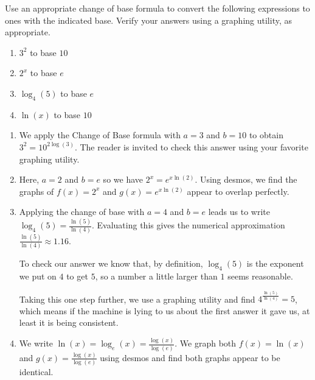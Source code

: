 \documentclass{ximera}
\begin{document}
\begin{example}  Use an appropriate change of base formula to convert the following expressions to ones with the indicated base.  Verify your answers using a graphing utility, as appropriate.


\begin{enumerate}

\item  $3^{2}$ to base $10$

\item  $2^{x}$ to base $e$

\item $\log_{4}(5)$ to base $e$

\item $\ln(x)$ to base $10$

\end{enumerate}

\begin{explanation}

\begin{enumerate}

\item  We apply the Change of Base formula with $a=3$ and $b=10$ to obtain $3^2 = 10^{2 \log(3)}$. The reader is invited to check this answer using your favorite graphing utility.

\item  Here, $a=2$ and $b = e$ so we have $2^{x} = e^{x \ln(2)}$.  Using desmos, we find the graphs of $f(x) = 2^x$ and $g(x) = e^{x \ln(2)}$ appear to overlap perfectly.

\begin{center}
\end{center}

\item  Applying the change of base with $a=4$ and $b=e$ leads us to write $\log_{4}(5) = \frac{\ln(5)}{\ln(4)}$.  Evaluating this gives the numerical approximation  $\frac{\ln(5)}{\ln(4)} \approx 1.16$. 

To check our answer we know that,  by definition, $\log_{4}(5)$ is the exponent we put on $4$ to get $5$, so a number a little larger than $1$ seems reasonable.

Taking this one step further, we use a graphing utility and find $4^{ \frac{\ln(5)}{\ln(4)}} = 5$, which means if  the machine  is lying to us about the first answer it gave us, at least it is being consistent.

\item  We write $\ln(x) = \log_{e}(x) = \frac{\log(x)}{\log(e)}$.  We graph both $f(x) = \ln(x)$ and $g(x) = \frac{\log(x)}{\log(e)}$ using desmos and find both graphs appear to be identical.

\begin{center}
\end{center}

\end{enumerate}
\end{explanation}
\end{example}
\end{document}
